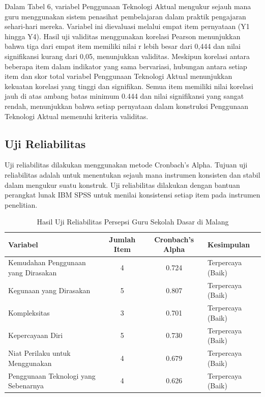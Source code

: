     Dalam Tabel 6, variabel Penggunaan Teknologi Aktual mengukur sejauh mana guru menggunakan sistem penasihat pembelajaran dalam praktik pengajaran sehari-hari mereka. Variabel ini dievaluasi melalui empat item pernyataan (Y1 hingga Y4). Hasil uji validitas menggunakan korelasi Pearson menunjukkan bahwa tiga dari empat item memiliki nilai r lebih besar dari 0,444 dan nilai signifikansi kurang dari 0,05, menunjukkan validitas. Meskipun korelasi antara beberapa item dalam indikator yang sama bervariasi, hubungan antara setiap item dan skor total variabel Penggunaan Teknologi Aktual menunjukkan kekuatan korelasi yang tinggi dan signifikan. Semua item memiliki nilai korelasi jauh di atas ambang batas minimum 0.444 dan nilai signifikansi yang sangat rendah, menunjukkan bahwa setiap pernyataan dalam konstruksi Penggunaan Teknologi Aktual memenuhi kriteria validitas.


\subsection{Uji Reliabilitas}

    Uji reliabilitas dilakukan menggunakan metode Cronbach’s Alpha. Tujuan uji reliabilitas adalah untuk menentukan sejauh mana instrumen konsisten dan stabil dalam mengukur suatu konstruk. Uji reliabilitas dilakukan dengan bantuan perangkat lunak IBM SPSS untuk menilai konsistensi setiap item pada instrumen penelitian.

    \begin{table}[H]
        \centering
        \caption{Hasil Uji Reliabilitas Persepsi Guru Sekolah Dasar di Malang}
        \label{tab:uji-reliabilitas-guru}
        \begin{tabularx}{\textwidth}{p{6cm}ccl}
            \toprule
            \textbf{Variabel} & \textbf{Jumlah Item} & \textbf{Cronbach’s Alpha} & \textbf{Kesimpulan} \\
            \midrule
            Kemudahan Penggunaan yang Dirasakan & 4 & 0.724 & Terpercaya (Baik) \\
            Kegunaan yang Dirasakan              & 5 & 0.807 & Terpercaya (Baik) \\
            Kompleksitas                         & 3 & 0.701 & Terpercaya (Baik) \\
            Kepercayaan Diri                     & 5 & 0.730 & Terpercaya (Baik) \\
            Niat Perilaku untuk Menggunakan      & 4 & 0.679 & Terpercaya (Baik) \\
            Penggunaan Teknologi yang Sebenarnya & 4 & 0.626 & Terpercaya (Baik) \\
            \bottomrule
        \end{tabularx}
    \end{table}


